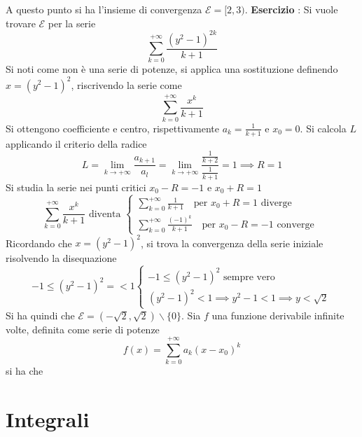 \documentclass[10pt, letterpaper]{report}
\begin{document}
A questo punto si ha l'insieme di convergenza $\mathcal{E}=[2,3)$.\acc
\textbf{Esercizio} :  Si vuole trovare $\mathcal{E}$ per la serie
$$ \displaystyle \sum_{k=0}^{+\infty}\frac{(y^2-1)^{2k}}{k+1} $$
Si noti come non è una serie di potenze, si applica una sostituzione definendo
$x=(y^2-1)^2$, riscrivendo la serie come $$
    \displaystyle \sum_{k=0}^{+\infty}\frac{x^{k}}{k+1}$$
Si ottengono coefficiente e centro, rispettivamente $a_k=\frac{1}{k+1}$ e $x_0 = 0$. Si
calcola $L$ applicando il criterio della radice
$$ L =\displaystyle \lim_{k\rightarrow+\infty}\frac{a_{k+1}}{a_l}=\displaystyle
    \lim_{k\rightarrow+\infty}\dfrac{\frac{1}{k+2}}{\frac{1}{k+1}}=1\implies R=1$$
Si studia la serie
nei punti critici   $x_0-R=-1$  e $x_0+R=1$
$$
    \displaystyle \sum_{k=0}^{+\infty}\frac{x^{k}}{k+1}\text{ diventa }  \begin{cases}
        \displaystyle \sum_{k=0}^{+\infty}\frac{1}{k+1} \text{  }\text{ per }x_0+R=1 \text{ diverge } \\
        \displaystyle \sum_{k=0}^{+\infty}\frac{(-1)^{k}}{k+1}\text{  }\text{ per }x_0-R=-1\text{ converge }
    \end{cases}$$
Ricordando che  $x=(y^2-1)^2$, si trova la convergenza della serie iniziale risolvendo
la disequazione
$$ -1\le (y^2-1)^2= <1\begin{cases}
        -1\le (y^2-1)^2\text{ sempre vero } \\ (y^2-1)^2<1\implies y^2-1<1\implies y<\sqrt{2}
    \end{cases}$$
Si ha quindi che $\mathcal{E}=(-\sqrt{2},\sqrt{2})\backslash\{0\}$.\acc
\prop{} Sia $f$ una funzione derivabile infinite volte, definita come serie di potenze
$$ f(x)=\displaystyle \sum_{k=0}^{+\infty}a_k(x-x_0)^k $$
si ha che 
\chapter{Integrali}
\end{document}
